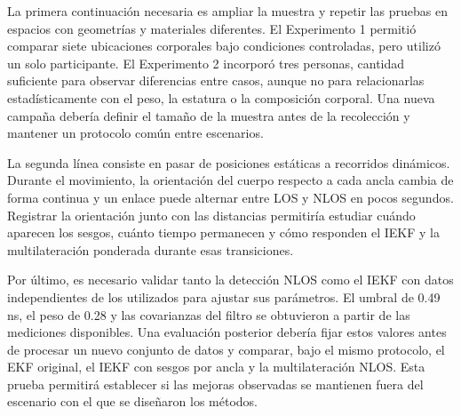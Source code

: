 La primera continuación necesaria es ampliar la muestra y repetir las pruebas en espacios con geometrías y materiales diferentes. El Experimento 1 permitió comparar siete ubicaciones corporales bajo condiciones controladas, pero utilizó un solo participante. El Experimento 2 incorporó tres personas, cantidad suficiente para observar diferencias entre casos, aunque no para relacionarlas estadísticamente con el peso, la estatura o la composición corporal. Una nueva campaña debería definir el tamaño de la muestra antes de la recolección y mantener un protocolo común entre escenarios.

La segunda línea consiste en pasar de posiciones estáticas a recorridos dinámicos. Durante el movimiento, la orientación del cuerpo respecto a cada ancla cambia de forma continua y un enlace puede alternar entre LOS y NLOS en pocos segundos. Registrar la orientación junto con las distancias permitiría estudiar cuándo aparecen los sesgos, cuánto tiempo permanecen y cómo responden el IEKF y la multilateración ponderada durante esas transiciones.

Por último, es necesario validar tanto la detección NLOS como el IEKF con datos independientes de los utilizados para ajustar sus parámetros. El umbral de 0.49 ns, el peso de 0.28 y las covarianzas del filtro se obtuvieron a partir de las mediciones disponibles. Una evaluación posterior debería fijar estos valores antes de procesar un nuevo conjunto de datos y comparar, bajo el mismo protocolo, el EKF original, el IEKF con sesgos por ancla y la multilateración NLOS. Esta prueba permitirá establecer si las mejoras observadas se mantienen fuera del escenario con el que se diseñaron los métodos.
